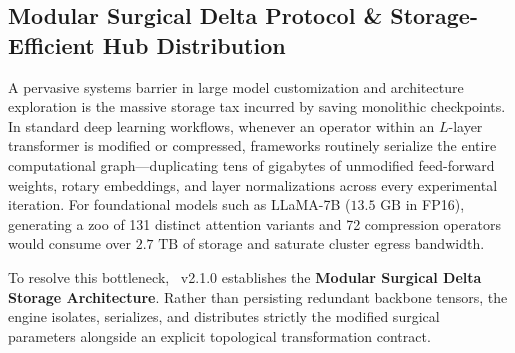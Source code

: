 \subsection{Modular Surgical Delta Protocol \& Storage-Efficient Hub Distribution}
\label{subsec:modular_surgical_delta}

A pervasive systems barrier in large model customization and architecture exploration is the massive storage tax incurred by saving monolithic checkpoints. In standard deep learning workflows, whenever an operator within an $L$-layer transformer is modified or compressed, frameworks routinely serialize the entire computational graph—duplicating tens of gigabytes of unmodified feed-forward weights, rotary embeddings, and layer normalizations across every experimental iteration. For foundational models such as LLaMA-7B ($13.5\text{ GB}$ in FP16), generating a zoo of 131 distinct attention variants and 72 compression operators would consume over $2.7\text{ TB}$ of storage and saturate cluster egress bandwidth.

To resolve this bottleneck, \neuralops\ v2.1.0 establishes the \textbf{Modular Surgical Delta Storage Architecture}. Rather than persisting redundant backbone tensors, the engine isolates, serializes, and distributes strictly the modified surgical parameters alongside an explicit topological transformation contract.

